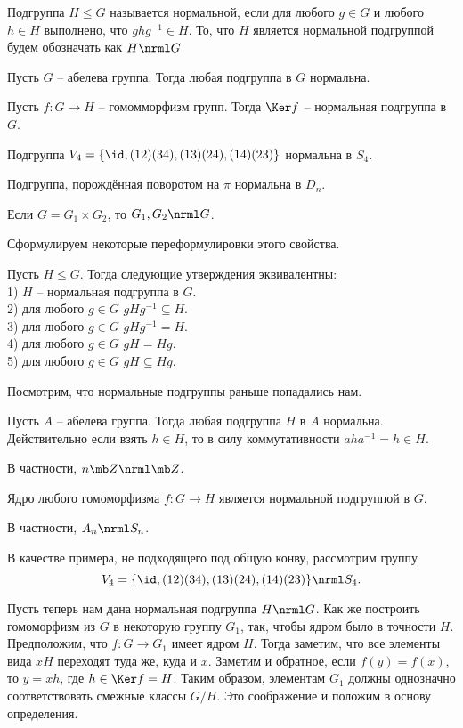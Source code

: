  Подгруппа $H\leq G$ называется нормальной, если для любого $g\in G$ и любого $h \in H$ выполнено, что $ghg^{-1}\in H$. То, что $H$ является нормальной подгруппой будем обозначать как $H \nrml G$
\edfn

\exm \enm
\item Пусть $G$ -- абелева группа. Тогда любая подгруппа в $G$ нормальна.
\item Пусть $f\colon G \to H$ -- гомомморфизм групп. Тогда $\Ker f$ -- нормальная подгруппа в $G$.
\item Подгруппа $V_4=\{\id, (12)(34), (13)(24), (14)(23)\}$ нормальна в $S_4$.
\item Подгруппа, порождённая поворотом на $\pi$ нормальна в $D_n$.
\item Если $G=G_1\times G_2$, то $G_1,G_2\nrml G$.
\eenm


Сформулируем некоторые переформулировки этого свойства.

\utv Пусть $H \leq G$. Тогда следующие утверждения эквивалентны:\\
1) $H$ -- нормальная подгруппа в $G$.\\
2) для любого $g\in G$ $gHg^{-1}\subseteq H$.\\
3) для любого $g\in G$ $gHg^{-1}= H$.\\
4) для любого $g\in G$ $gH=Hg$.\\
5) для любого $g\in G$ $gH\subseteq Hg$.
\eutv

Посмотрим, что нормальные подгруппы раньше попадались нам.\\


\exm \enm
\item Пусть $A$ -- абелева группа. Тогда любая подгруппа $H$ в $A$ нормальна. Действительно если взять $h\in H$, то в силу коммутативности $aha^{-1} =h \in H$.
\item В частности, $n \mb Z \nrml \mb Z$. 
\item Ядро любого гомоморфизма $f\colon G \to H$ является нормальной подгруппой в $G$.
\item В частности, $A_n \nrml S_n$.
\item В качестве примера, не подходящего под общую конву, рассмотрим группу $$V_4=\{\id, (12)(34),(13)(24),(14)(23)\} \nrml S_4.$$ 
\eenm

Пусть теперь нам дана нормальная подгруппа $H\nrml G$. Как же построить гомоморфизм из $G$ в некоторую группу $G_1$, так, чтобы ядром было в точности $H$. Предположим, что $f\colon G \to G_1$ имеет ядром $H$. Тогда заметим, что все элементы вида $xH$ переходят туда же, куда и $x$. Заметим и обратное, если $f(y)=f(x)$, то $y=xh$, где $h\in \Ker f =H$. Таким образом, элементам $G_1$ должны однозначно соответствовать смежные классы $G/H$. Это соображение и положим в основу определения.

